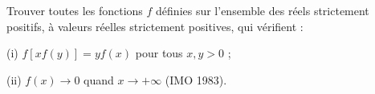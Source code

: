Trouver toutes les fonctions $f$ définies sur l'ensemble des réels strictement positifs, à valeurs réelles strictement positives, qui vérifient :

(i) $f[xf(y)] = yf(x)$ pour tous $x, y > 0$ ;

(ii) $f(x) \to 0$ quand $x \to +\infty$ (IMO 1983).

